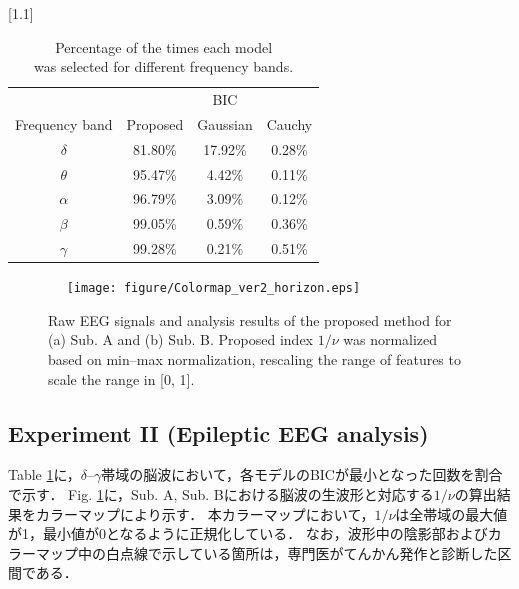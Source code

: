 \documentclass[journal]{IEEEtran}
\begin{document}
\begin{table}[!t]
 \begin{center}
 \caption[Subject conditions]{\small Percentage of the times each model\\
 was selected for different frequency bands.}
 \label{table:BIC}
 \vspace{-2.5mm}
 \scalebox{1.1}[1.1]{%
  \begin{tabular}{cccc}
   \toprule %
    & &{BIC} & \\
   {Frequency band} & {Proposed} &  Gaussian & Cauchy \\
   \midrule %
   $\delta$ & 81.80\%  & 17.92\%  & 0.28\% \\ %
   $\theta$ & 95.47\%  & 4.42\%  & 0.11\%  \\ %
   $\alpha$ & 96.79\%  & 3.09\%  & 0.12\%  \\ %
   $\beta$  & 99.05\%  & 0.59\%  & 0.36\%  \\ %
   $\gamma$ & 99.28\%  & 0.21\%  & 0.51\%  \\ %
   \bottomrule %
  \end{tabular}
  }
 \end{center}
\end{table}

\begin{figure}[!ht]　%
\centering
\texttt{[image: figure/Colormap\_ver2\_horizon.eps]}
\caption{Raw EEG signals and analysis results of the proposed method for (a) Sub. A and (b) Sub. B. Proposed index $1/\nu$ was normalized based on min--max normalization, rescaling the range of features to scale the range in [0, 1].  }
\label{fig:Colormap}
\end{figure}
\subsection{Experiment II (Epileptic EEG analysis)}
Table \ref{table:BIC}に，$\delta$--$\gamma$帯域の脳波において，各モデルのBICが最小となった回数を割合で示す．
Fig. \ref{fig:Colormap}に，Sub. A, Sub. Bにおける脳波の生波形と対応する$1/\nu$の算出結果をカラーマップにより示す．
本カラーマップにおいて，$1/\nu$は全帯域の最大値が1，最小値が0となるように正規化している．
なお，波形中の陰影部およびカラーマップ中の白点線で示している箇所は，専門医がてんかん発作と診断した区間である．
\end{document}
